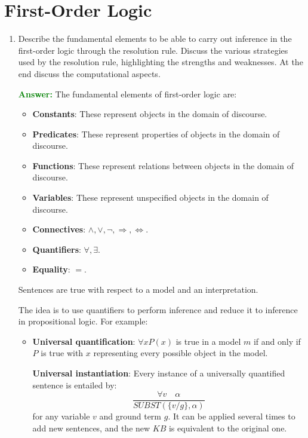 \documentclass[12pt]{article}
\begin{document}
\section{First-Order Logic}
\begin{enumerate}[label=\textbf{FOL.\arabic*}]

    \item Describe the fundamental elements to be able to carry out inference in the first-order logic through the resolution rule.
          Discuss the various strategies used by the resolution rule, highlighting the strengths and weaknesses.
          At the end discuss the computational aspects.

          \textcolor{green}{\textbf{Answer:}}
          The fundamental elements of first-order logic are:
          \begin{itemize}
              \item \textbf{Constants}: These represent objects in the domain of discourse.
              \item \textbf{Predicates}: These represent properties of objects in the domain of discourse.
              \item \textbf{Functions}: These represent relations between objects in the domain of discourse.
              \item \textbf{Variables}: These represent unspecified objects in the domain of discourse.
              \item \textbf{Connectives}: $\land, \lor, \lnot, \Rightarrow, \Leftrightarrow$.
              \item \textbf{Quantifiers}: $\forall, \exists$.
              \item \textbf{Equality}: $=$.
          \end{itemize}
          Sentences are true with respect to a model and an interpretation.

          The idea is to use quantifiers to perform inference and reduce it to inference in propositional logic. For example:
          \begin{itemize}
              \item \textbf{Universal quantification}: $\forall x P(x)$ is true in a model $m$ if and only if $P$ is true with $x$ representing every possible object in the model.

                    \textbf{Universal instantiation}: Every instance of a universally quantified sentence is entailed by:
                    \begin{equation}
                        \frac{\forall v \quad \alpha}{SUBST(\{v/g\},\alpha)}
                    \end{equation}
                    for any variable $v$ and ground term $g$. It can be applied several times to add new sentences, and the new $KB$ is equivalent to the original one.


\end{itemize}
\end{enumerate}
\end{document}
